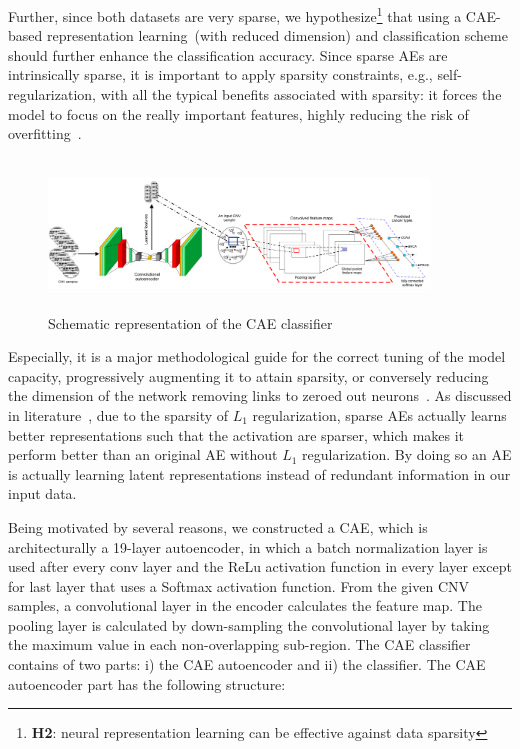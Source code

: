 \hspace*{3.5mm} Further, since both datasets are very sparse, we hypothesize\footnote{\textbf{H2}: neural representation learning can be effective against data sparsity} that using a CAE-based representation learning~(with reduced dimension) and classification scheme should further enhance the classification accuracy. Since sparse AEs are intrinsically sparse, it is important to apply sparsity constraints, e.g., self-regularization, with all the typical benefits associated with sparsity: it forces the model to focus on the really important features, highly reducing the risk of overfitting~\cite{karimBIB2019}. 

\begin{figure}[h]
	\centering
	\includegraphics[width=0.9\textwidth,height=40mm]{images/cae2.png}	
    \caption{Schematic representation of the CAE classifier~\cite{karimACCA2019}}
	\label{fig:cae}
\end{figure}

\hspace*{3.5mm} Especially, it is a major methodological guide for the correct tuning of the model capacity, progressively augmenting it to attain sparsity, or conversely reducing the dimension of the network removing links to zeroed out neurons~\cite{sparseAE}. As discussed in literature~\cite{karimBIB2019,karim2018recurrent}, due to the sparsity of $L_1$ regularization, sparse AEs actually learns better representations such that the activation are sparser, which makes it perform better than an original AE without $L_1$ regularization. By doing so an AE is actually learning latent representations instead of redundant information in our input data. 

\hspace*{3.5mm} Being motivated by several reasons, we constructed a CAE, which is architecturally a 19-layer autoencoder, in which a batch normalization layer is used after every conv layer and the ReLu activation function in every layer except for last layer that uses a Softmax activation function. From the given CNV samples, a convolutional layer in the encoder calculates the feature map. The pooling layer is calculated by down-sampling the convolutional layer by taking the maximum value in each non-overlapping sub-region. The CAE classifier contains of two parts: i) the CAE autoencoder and ii) the classifier. The CAE autoencoder part has the following structure: 

